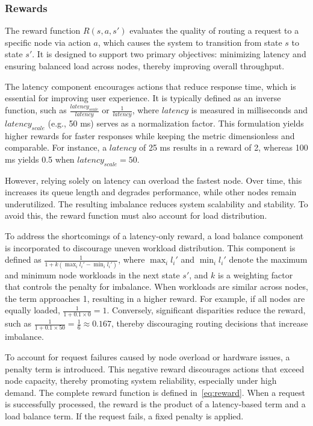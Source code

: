 \documentclass[lnbip]{svmultln}
\begin{document}
\subsubsection{Rewards}\label{s:3.3.3}
The reward function $R(s, a, s')$ evaluates the quality of routing a request to a specific node via action $a$, which causes the system to transition from state $s$ to state $s'$. It is designed to support two primary objectives: minimizing latency and ensuring balanced load across nodes, thereby improving overall throughput.

The latency component encourages actions that reduce response time, which is essential for improving user experience. It is typically defined as an inverse function, such as $\frac{{latency}_{scale}}{{latency}}$ or $\frac{1}{{latency}}$, where $latency$ is measured in milliseconds and ${latency}_{scale}$ (e.g., 50 ms) serves as a normalization factor. This formulation yields higher rewards for faster responses while keeping the metric dimensionless and comparable. For instance, a $latency$ of 25 ms results in a reward of 2, whereas 100 ms yields 0.5 when ${latency}_{scale} = 50$.

However, relying solely on latency can overload the fastest node. Over time, this increases its queue length and degrades performance, while other nodes remain underutilized. The resulting imbalance reduces system scalability and stability. To avoid this, the reward function must also account for load distribution.

To address the shortcomings of a latency-only reward, a load balance component is incorporated to discourage uneven workload distribution. This component is defined as $\frac{1}{1 + k (\max_i l_i' - \min_i l_i')}$, where $\max_i l_i'$ and $\min_i l_i'$ denote the maximum and minimum node workloads in the next state $s'$, and $k$ is a weighting factor that controls the penalty for imbalance. When workloads are similar across nodes, the term approaches 1, resulting in a higher reward. For example, if all nodes are equally loaded, $\frac{1}{1 + 0.1 \times 0} = 1$. Conversely, significant disparities reduce the reward, such as $\frac{1}{1 + 0.1 \times 50} = \frac{1}{6} \approx 0.167$, thereby discouraging routing decisions that increase imbalance.

To account for request failures caused by node overload or hardware issues, a penalty term is introduced. This negative reward discourages actions that exceed node capacity, thereby promoting system reliability, especially under high demand.
The complete reward function is defined in~\eqref{eq:reward}. When a request is successfully processed, the reward is the product of a latency-based term and a load balance term. If the request fails, a fixed penalty is applied.
\end{document}
